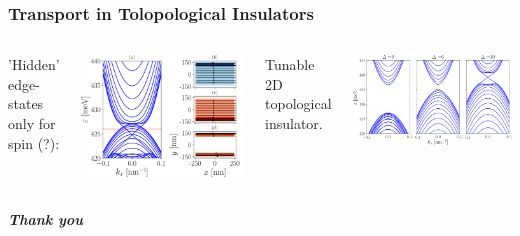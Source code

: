 \begin{frame}
    \frametitle{Transport in Tolopological Insulators}

    \begin{columns}

        'Hidden' edge-states only for spin (?):

        \includegraphics[width=\textwidth]{phases_of_matter/110_delta_0_E_426.png}

        Tunable 2D topological insulator.

        \includegraphics[width=\textwidth]{phases_of_matter/3_plots_juntos.png}
    \end{columns}

\end{frame}

\begin{frame}
      \centering \Huge
      \textbf{\emph{Thank you}}
\end{frame}
